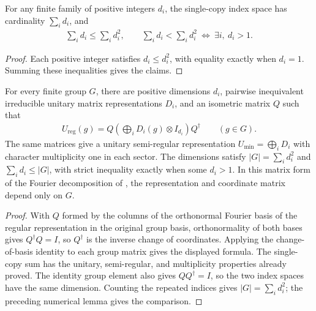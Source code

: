 \begin{lemma}%
    \label{lem:peps_positive_dimension_bounds}
    \leanok
    For any finite family of positive integers $d_i$, the single-copy index
    space has cardinality $\sum_i d_i$, and
    \begin{align}
        \sum_i d_i\leq\sum_i d_i^2,
        \qquad
        \sum_i d_i<\sum_i d_i^2\ \Longleftrightarrow\ \exists i,\ d_i>1.
    \end{align}
\end{lemma}
\begin{proof}\leanok
    Each positive integer satisfies $d_i\leq d_i^2$, with equality exactly
    when $d_i=1$. Summing these inequalities gives the claims.
\end{proof}

\begin{lemma}%
    \label{thm:peps_regular_fourier_matrix}
    \leanok
    For every finite group $G$, there are positive dimensions $d_i$,
    pairwise inequivalent irreducible unitary matrix representations $D_i$,
    and an isometric matrix $Q$ such that
    \begin{align}
        U_{\mathrm{reg}}(g)
        =Q\left(\bigoplus_i D_i(g)\otimes I_{d_i}\right)Q^\dagger
        \qquad(g\in G).
    \end{align}
    The same matrices give a unitary semi-regular representation
    $U_{\min}=\bigoplus_iD_i$ with character multiplicity one in each sector.
    The dimensions satisfy $|G|=\sum_i d_i^2$ and
    $\sum_i d_i\leq |G|$, with strict inequality exactly when some $d_i>1$.
    In this matrix form of the Fourier decomposition of
    \cite[Section~7]{Schuch2010PEPS}, the representation and coordinate matrix
    depend only on $G$.
\end{lemma}

\begin{proof}\leanok
    With $Q$ formed by the columns of the orthonormal Fourier basis of the
    regular representation in the original group basis, orthonormality of both
    bases gives $Q^\dagger Q=I$, so $Q^\dagger$ is the inverse change of
    coordinates. Applying the change-of-basis identity
    to each group matrix gives the displayed formula. The single-copy sum
    has the unitary, semi-regular, and multiplicity properties already proved.
    The identity group element also gives $QQ^\dagger=I$, so the two index
    spaces have the same dimension. Counting the repeated indices gives
    $|G|=\sum_i d_i^2$; the preceding numerical lemma gives the comparison.
\end{proof}
